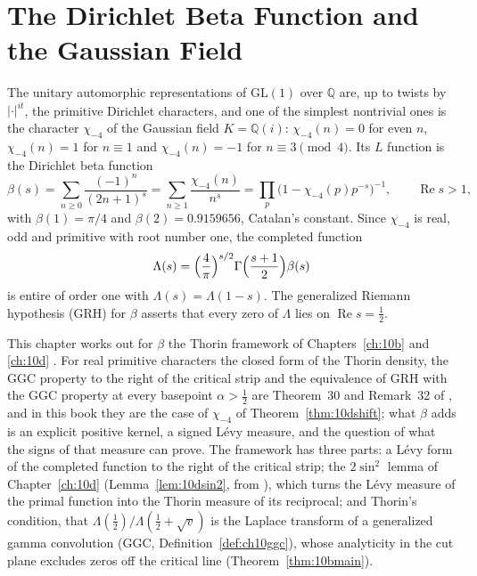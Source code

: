 \chapter[Dirichlet Beta and the Gaussian Field]{The Dirichlet Beta Function and the Gaussian Field}\label{ch:beta}

The unitary automorphic representations of $\mathrm{GL}(1)$ over $\mathbb Q$ are, up to twists by $\lvert\cdot\rvert^{it}$, the primitive Dirichlet characters, and one of the simplest nontrivial ones is the character $\chi_{-4}$ of the Gaussian field $K=\mathbb Q(i)$: $\chi_{-4}(n)=0$ for even $n$, $\chi_{-4}(n)=1$ for $n\equiv1$ and $\chi_{-4}(n)=-1$ for $n\equiv3\pmod 4$. Its $L$ function is the Dirichlet beta function
\begin{equation}\label{beta:eq:beta}
\beta(s)=\sum_{n\ge 0}\frac{(-1)^n}{(2n+1)^s}=\sum_{n\ge1}\frac{\chi_{-4}(n)}{n^s}
=\prod_{p}\bigl(1-\chi_{-4}(p)p^{-s}\bigr)^{-1},\qquad \operatorname{Re} s>1,
\end{equation}
with $\beta(1)=\pi/4$ and $\beta(2)=0.9159656$, Catalan's constant. Since $\chi_{-4}$ is real, odd and primitive with root number one, the completed function
\begin{equation}\label{beta:eq:Lambda}
\Lambda(s)=\Bigl(\frac{4}{\pi}\Bigr)^{s/2}\Gamma\Bigl(\frac{s+1}{2}\Bigr)\beta(s)
\end{equation}
is entire of order one with $\Lambda(s)=\Lambda(1-s)$. The generalized Riemann hypothesis (GRH) for $\beta$ asserts that every zero of $\Lambda$ lies on $\operatorname{Re} s=\tfrac12$.

This chapter works out for $\beta$ the Thorin framework of Chapters~\ref{ch:10b} and \ref{ch:10d} \cite{polson2017,polson2018vdp}. For real primitive characters the closed form of the Thorin density, the GGC property to the right of the critical strip and the equivalence of GRH with the GGC property at every basepoint $\alpha>\frac12$ are Theorem~30 and Remark~32 of \cite{polson2018vdp}, and in this book they are the case of $\chi_{-4}$ of Theorem~\ref{thm:10dshift}; what $\beta$ adds is an explicit positive kernel, a signed L\'evy measure, and the question of what the signs of that measure can prove. The framework has three parts: a L\'evy form of the completed function to the right of the critical strip; the $2\sin^2$ lemma of Chapter~\ref{ch:10d} (Lemma~\ref{lem:10dsin2}, from \cite{polson2018vdp}), which turns the L\'evy measure of the primal function into the Thorin measure of its reciprocal; and Thorin's condition, that $\Lambda(\tfrac12)/\Lambda(\tfrac12+\sqrt v)$ is the Laplace transform of a generalized gamma convolution (GGC, Definition~\ref{def:ch10ggc}), whose analyticity in the cut plane excludes zeros off the critical line (Theorem~\ref{thm:10bmain}).

